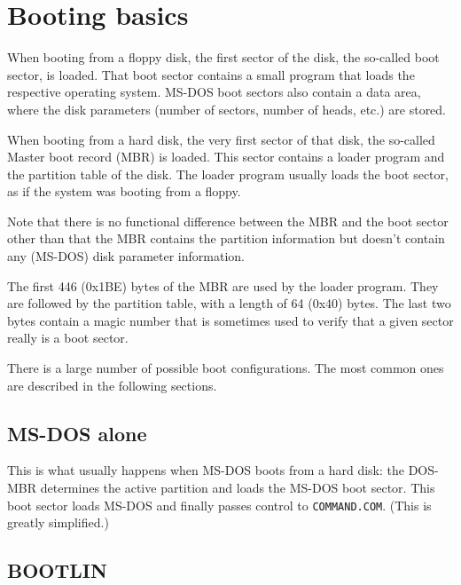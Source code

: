 \section{Booting basics}

When booting from a floppy disk, the first sector of the disk, the so-called
boot sector, is loaded. That boot sector contains a small program that loads
the respective operating system. MS-DOS boot sectors also contain 
a data area, where the disk parameters (number of sectors, number of
heads, etc.) are stored.

When booting from a hard disk, the very first sector of that disk, the
so-called Master boot record (MBR) is loaded. This sector contains a
loader program and the partition table of the disk. The loader program
usually loads the boot sector, as if the system was booting from a floppy.

Note that there is no functional difference between the MBR and the boot
sector other than that the MBR contains the partition information but
doesn't contain any (MS-DOS) disk parameter information.

The first 446 (0x1BE) bytes of the MBR are used by the loader program.
They are followed by the partition table, with a length of 64 (0x40)
bytes. The last two bytes contain a magic number that is sometimes used to
verify that a given sector really is a boot sector.

There is a large number of possible boot configurations. The most common
ones are described in the following sections.


\subsection{MS-DOS alone}


This is what usually happens when MS-DOS boots from a hard disk: the DOS-MBR
determines the active partition and loads the MS-DOS boot sector. This boot
sector loads MS-DOS and finally passes control to {\tt COMMAND.COM}. (This is
greatly simplified.)


\subsection{BOOTLIN}


